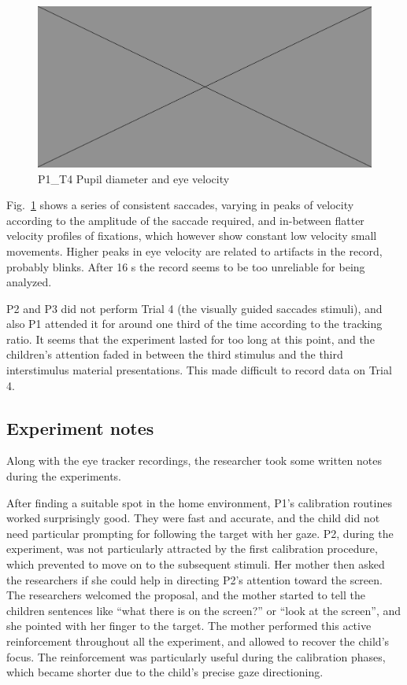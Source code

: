 \begin{figure}[h]
  \centering
  \includegraphics[width=.5\textwidth]{figures/placeholderImg.jpg}
  \caption[P1\_T4 pupil velocity]{P1\_T4 Pupil diameter and eye velocity}
  \label{fig:P1_T4_vel}
\end{figure}

Fig.~\ref{fig:P1_T4_vel} shows a series of consistent saccades, varying in peaks of velocity according to the amplitude of the saccade required, and in-between flatter velocity profiles of fixations, which however show constant low velocity small movements. Higher peaks in eye velocity are related to artifacts in the record, probably blinks. After 16 s the record seems to be too unreliable for being analyzed.

P2 and P3 did not perform Trial 4 (the visually guided saccades stimuli), and also P1 attended it for around one third of the time according to the tracking ratio. It seems that the experiment lasted for too long at this point, and the children’s attention faded in between the third stimulus and the third interstimulus material presentations. This made difficult to record data on Trial 4.

\subsection{Experiment notes}
\label{sec:expnotes}

Along with the eye tracker recordings, the researcher took some written notes during the experiments.

After finding a suitable spot in the home environment, P1’s calibration routines worked surprisingly good. They were fast and accurate, and the child did not need particular prompting for following the target with her gaze.
P2, during the experiment, was not particularly attracted by the first calibration procedure, which prevented to move on to the subsequent stimuli. Her mother then asked the researchers if she could help in directing P2’s attention toward the screen. The researchers welcomed the proposal, and the mother started to tell the children sentences like “what there is on the screen?” or “look at the screen”, and she pointed with her finger to the target. The mother performed this active reinforcement throughout all the experiment, and allowed to recover the child’s focus. The reinforcement was particularly useful during the calibration phases, which became shorter due to the child’s precise gaze directioning.

